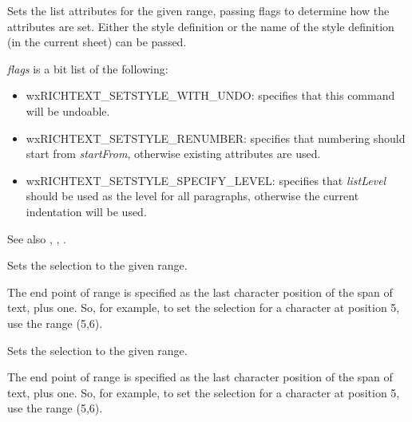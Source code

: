 Sets the list attributes for the given range, passing flags to determine how the attributes are set.
Either the style definition or the name of the style definition (in the current sheet) can be passed.

{\it flags} is a bit list of the following:

\begin{itemize}\itemsep=0pt
\item wxRICHTEXT\_SETSTYLE\_WITH\_UNDO: specifies that this command will be undoable.
\item wxRICHTEXT\_SETSTYLE\_RENUMBER: specifies that numbering should start from {\it startFrom}, otherwise existing attributes are used.
\item wxRICHTEXT\_SETSTYLE\_SPECIFY\_LEVEL: specifies that {\it listLevel} should be used as the level for all paragraphs, otherwise the current indentation will be used.
\end{itemize}

See also , , .

\label{wxrichtextctrlsetselection}


Sets the selection to the given range.

The end point of range is specified as the last character position of the span of text, plus one.
So, for example, to set the selection for a character at position 5, use the range (5,6).

\label{wxrichtextctrlsetselectionrange}


Sets the selection to the given range.

The end point of range is specified as the last character position of the span of text, plus one.
So, for example, to set the selection for a character at position 5, use the range (5,6).

\label{wxrichtextctrlsetstyle}


